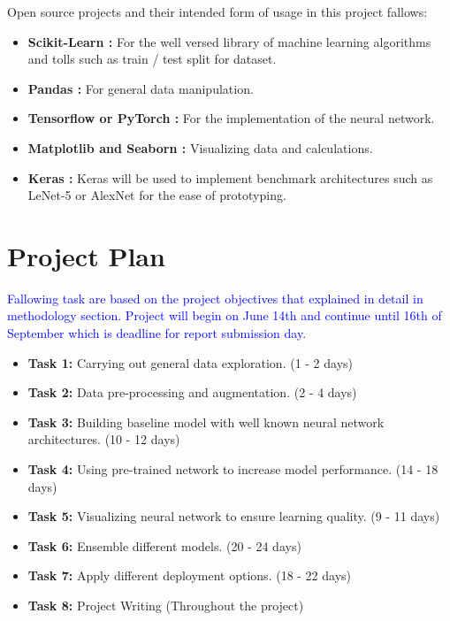 \documentclass[12pt, twoside, a4paper]{article}
\begin{document}
Open source projects and their intended form of usage in this project fallows:

\begin{itemize}
    \item \textbf{Scikit-Learn \cite{scikit-learn}: }For the well versed library of machine learning algorithms and tolls such as train / test split for dataset.
    \item \textbf{Pandas \cite{pandas}: }For general data manipulation.
    \item \textbf{Tensorflow \cite{tensorflow} or PyTorch \cite{pytorch}: }For the implementation of the neural network.
    \item \textbf{Matplotlib \cite{matplotlib} and Seaborn \cite{seaborn}: }Visualizing data and calculations.
    \item \textbf{Keras \cite{keras}: }Keras will be used to implement benchmark architectures such as LeNet-5 or AlexNet for the ease of prototyping.
\end{itemize}
\clearpage

\section{Project Plan}
\textcolor{blue}{Fallowing task are based on the project objectives that explained in detail in methodology section. Project will begin on June 14th and continue until 16th of September which is deadline for report submission day. } 

\begin{itemize}
    \color{blue}
    \item \textbf{Task 1: }Carrying out general data exploration. (1 - 2 days)
    \item \textbf{Task 2: }Data pre-processing and augmentation. (2 - 4 days)
    \item \textbf{Task 3: }Building baseline model with well known neural network architectures. (10 - 12 days)
    \item \textbf{Task 4: }Using pre-trained network to increase model performance. (14 - 18 days)
    \item \textbf{Task 5: }Visualizing neural network to ensure learning quality. (9 - 11 days)
    \item \textbf{Task 6: }Ensemble different models. (20 - 24 days)
    \item \textbf{Task 7: }Apply different deployment options. (18 - 22 days)
    \item \textbf{Task 8: }Project Writing (Throughout the project)
\end{itemize}
\end{document}

